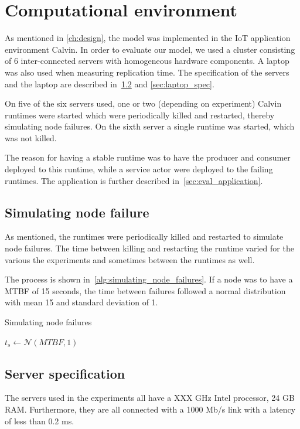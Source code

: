 \documentclass{cslthse-msc}
\begin{document}
\section{Computational environment} \label{sec:eval_comp_env}
As mentioned in \cref{ch:design}, the model was implemented in the IoT application environment Calvin. In order to evaluate our model, we used a cluster consisting of 6 inter-connected servers with homogeneous hardware components. A laptop was also used when measuring replication time. The specification of the servers and the laptop are described in~\cref{sec:server_spec} and \cref{sec:laptop_spec}.

On five of the six servers used, one or two (depending on experiment) Calvin runtimes were started which were periodically killed and restarted, thereby simulating node failures. On the sixth server a single runtime was started, which was not killed.

The reason for having a stable runtime was to have the producer and consumer deployed to this runtime, while a service actor were deployed to the failing runtimes. The application is further described in~\cref{sec:eval_application}.

\subsection{Simulating node failure} \label{sec:simulating_node_failure}
As mentioned, the runtimes were periodically killed and restarted to simulate node failures. The time between killing and restarting the runtime varied for the various the experiments and sometimes between the runtimes as well. 

The process is shown in~\cref{alg:simulating_node_failures}. If a node was to have a MTBF of 15 seconds, the time between failures followed a normal distribution with mean 15 and standard deviation of 1.

\begin{algorithm} 
	\caption{Simulating node failures} \label{alg:simulating_node_failures}
	\begin{algorithmic}[1]
		\State
		\State $t_{s}\gets \mathcal{N} (MTBF,1)$
		\State
		\State
	\EndWhile
	\end{algorithmic}
\end{algorithm}

\subsection{Server specification} \label{sec:server_spec}
The servers used in the experiments all have a XXX GHz Intel processor, 24 GB RAM. Furthermore, they are all connected with a 1000 Mb/s link with a latency of less than 0.2 ms. 
\end{document}
